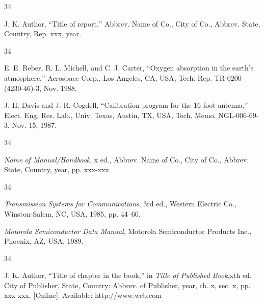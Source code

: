 \documentclass{IEEEojcsys}
\begin{document}
\vspace*{-12pt}
\begin{thebibliography}{34}
\item[]\hskip-18pt
J. K. Author, ``Title of report,'' Abbrev. Name of Co., City of Co., Abbrev. State, Country, Rep. xxx, year.
\end{thebibliography}\vspace*{-12pt}

\vspace*{-12pt}
\begin{thebibliography}{34}
\setcounter{enumiv}{5}

\bibitem{} E. E. Reber, R. L. Michell, and C. J. Carter, ``Oxygen absorption in the earth's atmosphere,'' Aerospace Corp., Los Angeles, CA, USA, Tech. Rep. TR-0200 (4230-46)-3, Nov. 1988.

\bibitem{} J. H. Davis and J. R. Cogdell, ``Calibration program for the 16-foot antenna,'' Elect. Eng. Res. Lab., Univ. Texas, Austin, TX, USA, Tech. Memo. NGL-006-69-3, Nov. 15, 1987.
\end{thebibliography}

\vspace*{-12pt}
\begin{thebibliography}{34}
\item[]\hskip-18pt
{\em Name of Manual/Handbook}, x ed., Abbrev. Name of Co., City of Co., Abbrev. State, Country, year, pp. xxx-xxx.
\end{thebibliography}\vspace*{-12pt}

\vspace*{-12pt}

\begin{thebibliography}{34}
\setcounter{enumiv}{7}

\bibitem{} {\em Transmission Systems for Communications}, 3rd ed., Western Electric Co., Winston-Salem, NC, USA, 1985, pp. 44--60.

\bibitem{} {\em Motorola Semiconductor Data Manual}, Motorola Semiconductor Products Inc., Phoenix, AZ, USA, 1989.
\end{thebibliography}

\vspace*{-12pt}
\begin{thebibliography}{34}
\item[]\hskip-18pt
J. K. Author, ``Title of chapter in the book,'' in {\em Title of Published Book},\break xth ed. City of Publisher, State, Country: Abbrev. of Publisher, year, ch. x, sec. x, pp. xxx xxx. [Online]. Available: http://www.web.com 
\end{thebibliography}\vspace*{-12pt}
\end{document}
